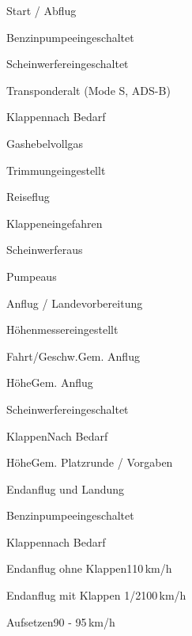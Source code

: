 \begin{checklist}{Start / Abflug}
	  \item{Benzinpumpe}{eingeschaltet}
	  \item{Scheinwerfer}{eingeschaltet}
	  \item{Transponder}{alt (Mode S, ADS-B)}
	  \item{Klappen}{nach Bedarf}
	\vspace{2mm}
	  \item{Gashebel}{vollgas}
	\item{Trimmung}{eingestellt}
\end{checklist}
	
\begin{checklist}{Reiseflug}
	\item{Klappen}{eingefahren}
	\item{Scheinwerfer}{aus}
	\item{Pumpe}{aus} 
	 
\end{checklist}

\begin{checklist}{Anflug / Landevorbereitung}
	\item{Höhenmesser}{eingestellt}
	\item{Fahrt/Geschw.}{Gem. Anflug}
	\item{Höhe}{Gem. Anflug}
	\item{Scheinwerfer}{eingeschaltet}
	\item{Klappen}{Nach Bedarf}
	\item{Höhe}{Gem. Platzrunde / Vorgaben}
\end{checklist}

\begin{checklist}{Endanflug und Landung}
	\item{Benzinpumpe}{eingeschaltet}
	\item{Klappen}{nach Bedarf}
	\item{Endanflug ohne Klappen}{110\,km/h}
	\item{Endanflug mit Klappen 1/2}{100\,km/h}
	\item{Aufsetzen}{90 - 95\,km/h}
\end{checklist}

